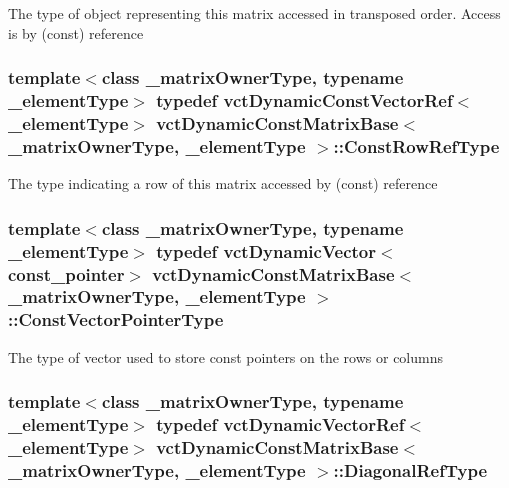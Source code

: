 The type of object representing this matrix accessed in transposed order. Access is by (const) reference \hypertarget{classvct_dynamic_const_matrix_base_a42a300cb1afd5f0602ba5c2d7d9cc40b}{
\subsubsection[{Const\-Row\-Ref\-Type}]{\setlength{\rightskip}{0pt plus 5cm}template$<$class \-\_\-matrix\-Owner\-Type, typename \-\_\-element\-Type$>$ typedef {\bf vct\-Dynamic\-Const\-Vector\-Ref}$<$\-\_\-element\-Type$>$ {\bf vct\-Dynamic\-Const\-Matrix\-Base}$<$ \-\_\-matrix\-Owner\-Type, \-\_\-element\-Type $>$\-::{\bf Const\-Row\-Ref\-Type}}}\label{classvct_dynamic_const_matrix_base_a42a300cb1afd5f0602ba5c2d7d9cc40b}
The type indicating a row of this matrix accessed by (const) reference \hypertarget{classvct_dynamic_const_matrix_base_ae4eb1369d9d05fdf98786c5583834e73}{
\subsubsection[{Const\-Vector\-Pointer\-Type}]{\setlength{\rightskip}{0pt plus 5cm}template$<$class \-\_\-matrix\-Owner\-Type, typename \-\_\-element\-Type$>$ typedef {\bf vct\-Dynamic\-Vector}$<$const\-\_\-pointer$>$ {\bf vct\-Dynamic\-Const\-Matrix\-Base}$<$ \-\_\-matrix\-Owner\-Type, \-\_\-element\-Type $>$\-::{\bf Const\-Vector\-Pointer\-Type}}}\label{classvct_dynamic_const_matrix_base_ae4eb1369d9d05fdf98786c5583834e73}
The type of vector used to store const pointers on the rows or columns \hypertarget{classvct_dynamic_const_matrix_base_a2773e894d2ce8aa7a479eeecc535ac33}{
\subsubsection[{Diagonal\-Ref\-Type}]{\setlength{\rightskip}{0pt plus 5cm}template$<$class \-\_\-matrix\-Owner\-Type, typename \-\_\-element\-Type$>$ typedef {\bf vct\-Dynamic\-Vector\-Ref}$<$\-\_\-element\-Type$>$ {\bf vct\-Dynamic\-Const\-Matrix\-Base}$<$ \-\_\-matrix\-Owner\-Type, \-\_\-element\-Type $>$\-::{\bf Diagonal\-Ref\-Type}}}\label{classvct_dynamic_const_matrix_base_a2773e894d2ce8aa7a479eeecc535ac33}
